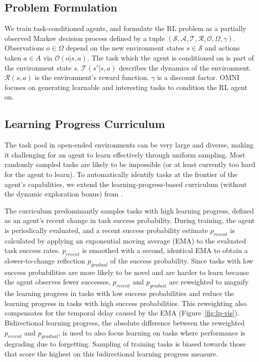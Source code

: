 \documentclass{article} %
\begin{document}
\subsection{Problem Formulation}

We train task-conditioned agents, and formulate the RL problem as a partially observed Markov decision process \citep{kaelbling1998planning} defined by a tuple $(\mathcal{S}, \mathcal{A}, \mathcal{T}, \mathcal{R}, \mathcal{O}, \Omega, \gamma)$. Observations $o \in \Omega$ depend on the new environment states $s \in \mathcal{S}$ and actions taken $a \in A$ via $\mathcal{O}(o|s, a)$. The task which the agent is conditioned on is part of the environment state $s$. $\mathcal{T}(s'|s, a)$ describes the dynamics of the environment. $\mathcal{R}(s, a)$ is the environment's reward function. $\gamma$ is a discount factor. OMNI focuses on generating learnable and interesting tasks to condition the RL agent on.

\subsection{Learning Progress Curriculum}
\label{sec:lp}
The task pool in open-ended environments can be very large and diverse, making it challenging for an agent to learn effectively through uniform sampling. Most randomly sampled tasks are likely to be impossible (or at least currently too hard for the agent to learn). To automatically identify tasks at the frontier of the agent's capabilities, we extend the learning-progress-based curriculum (without the dynamic exploration bonus) from \citet{ingmar}.

The curriculum predominantly samples tasks with high learning progress, defined as an agent's recent change in task success probability. During training, the agent is periodically evaluated, and a recent success probability estimate $p_{recent}$ is calculated by applying an exponential moving average (EMA) to the evaluated task success rates. $p_{recent}$ is smoothed with a second, identical EMA to obtain a slower-to-change reflection $p_{gradual}$ of the success probability. Since tasks with low success probabilities are more likely to be novel and are harder to learn because the agent observes fewer successes, $p_{recent}$ and $p_{gradual}$ are reweighted to magnify the learning progress in tasks with low success probabilities and reduce the learning progress in tasks with high success probabilities. This reweighting also compensates for the temporal delay caused by the EMA (Figure~\ref{fig:lp-vis}). Bidirectional learning progress, the absolute difference between the reweighted $p_{recent}$ and $p_{gradual}$, is used to also focus learning on tasks where performance is degrading due to forgetting. Sampling of training tasks is biased towards those that score the highest on this bidirectional learning progress measure.
\end{document}
